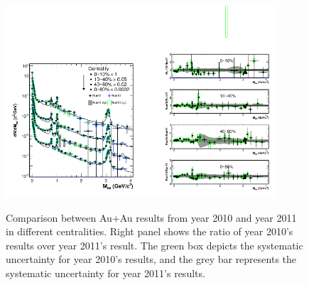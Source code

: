 \begin{figure}
\begin{centering}
\includegraphics[width=0.45\textwidth]{fig/3.Analysis/Run11/Cen_Yield_cocktail_Run11vsRun10}\includegraphics[width=0.45\textwidth]{fig/3.Analysis/Run11/cen_ratio_Run11vsRun10_Run11vsRun10}
\par\end{centering}

\protect\caption{Comparison between Au+Au results from year 2010 and year 2011 in different
centralities. Right panel shows the ratio of year 2010's results over
year 2011's result. The green box depicts the systematic uncertainty
for year 2010's results, and the grey bar represents the systematic
uncertainty for year 2011's results.}


\label{fig: Run10vsRun11 cen}

\end{figure}


